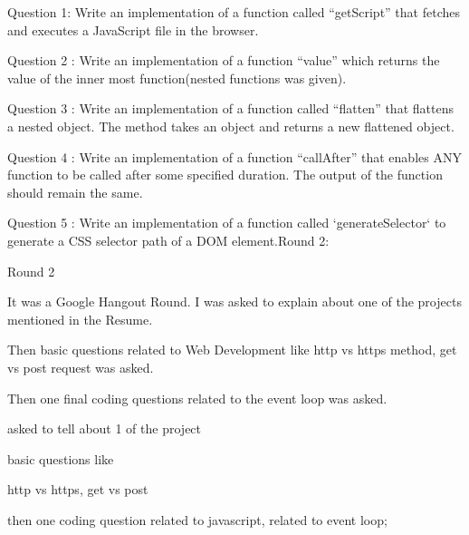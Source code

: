 Question 1: 
Write an implementation of a function called “getScript” that fetches and executes a JavaScript file in the browser.

Question 2 : Write an implementation of a function “value” which returns the value of the inner most function(nested functions was given).

Question 3 : Write an implementation of a function called “flatten” that flattens a nested object. The method takes an object and returns a new flattened object.

Question 4 : Write an implementation of a function “callAfter” that enables ANY function to be called after some specified duration. The output of the function should remain the same.

Question 5 : Write an implementation of a function called `generateSelector` to generate a CSS selector path of a DOM element.Round 2:


Round 2

It was a Google Hangout Round. I was asked to explain about one of the projects mentioned in the Resume.

Then basic questions related to Web Development like http vs https method, get vs post request was asked.

Then one final coding questions related to the event loop was asked.

asked to tell about 1 of the project

basic questions like

http vs https, get vs post

then one coding question related to javascript, related to event loop;